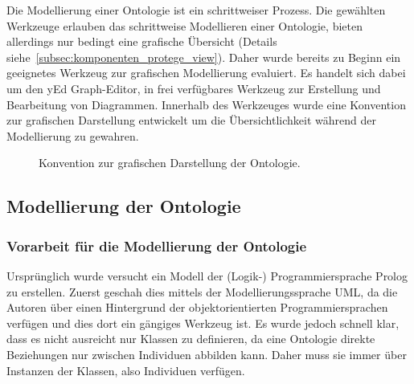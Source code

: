 Die Modellierung einer Ontologie ist ein schrittweiser Prozess. Die gewählten Werkzeuge erlauben das schrittweise Modellieren einer Ontologie, bieten allerdings nur bedingt eine grafische Übersicht (Details siehe~\ref{subsec:komponenten_protege_view}). Daher wurde bereits zu Beginn ein geeignetes Werkzeug zur grafischen Modellierung evaluiert. Es handelt sich dabei um den yEd Graph-Editor, in frei verfügbares Werkzeug zur Erstellung und Bearbeitung von Diagrammen. Innerhalb des Werkzeuges wurde eine Konvention zur grafischen Darstellung entwickelt um die Übersichtlichkeit während der Modellierung zu gewahren.

\begin{figure}[H]
    \centering {}
    \caption{Konvention zur grafischen Darstellung der Ontologie.\label{fig:vorgehen:grundlagen:technisch:yed}\protect\footnotemark}
\end{figure}

\subsection{Modellierung der Ontologie}
\label{sub:modellierung_der_ontologie}

\subsubsection{Vorarbeit für die Modellierung der Ontologie}
\label{sub:modellierung_der_ontologie_vorarbeit}
Ursprünglich wurde versucht ein Modell der (Logik-) Programmiersprache Prolog zu erstellen. Zuerst geschah dies mittels der Modellierungssprache UML, da die Autoren über einen Hintergrund der objektorientierten Programmiersprachen verfügen und dies dort ein gängiges Werkzeug ist. Es wurde jedoch schnell klar, dass es nicht ausreicht nur Klassen zu definieren, da eine Ontologie direkte Beziehungen nur zwischen Individuen abbilden kann. Daher muss sie immer über Instanzen der Klassen, also Individuen verfügen.

